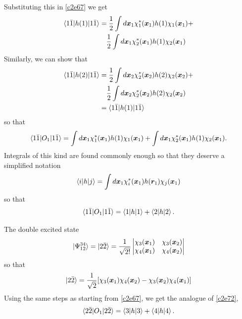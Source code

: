 Substituting this in \eqref{c2e67} we get
\begin{equation}\label{c2e68}
\begin{aligned}
\braket{1\bar{1}|h(1)|1\bar{1}} &= 
\frac{1}{2}\int d\bm{x}_1\chi_1^\ast(\bm{x}_1)h(1)\chi_1(\bm{x}_1) + \\
 &\quad\frac{1}{2}\int d\bm{x}_1 \chi_2^\ast(\bm{x}_1)h(1)\chi_2(\bm{x}_1)
\end{aligned}
\end{equation}
Similarly, we can show that
\begin{equation}\label{c2e69}
\begin{aligned}
\braket{1\bar{1}|h(2)|1\bar{1}} &= 
\frac{1}{2}\int d\bm{x}_2\chi_2^\ast(\bm{x}_2)h(2)\chi_2(\bm{x}_2) + \\
 &\quad\frac{1}{2}\int d\bm{x}_2 \chi_2^\ast(\bm{x}_2)h(2)\chi_2(\bm{x}_2) \\
 &= \braket{1\bar{1}|h(1)|1\bar{1}}
\end{aligned}
\end{equation}
so that
\begin{equation}\label{c2e70}
\braket{1\bar{1}|O_1|1\bar{1}} = 
\int d\bm{x}_1\chi_1^\ast(\bm{x}_1)h(1)\chi_1(\bm{x}_1) +
\int d\bm{x}_1 \chi_2^\ast(\bm{x}_1)h(1)\chi_2(\bm{x}_1).
\end{equation}
Integrals of this kind are found commonly enough so that they deserve a 
simplified notation
\begin{equation}\label{c2e71}
\braket{i|h|j} = 
\int d\bm{x}_1\chi_i^\ast(\bm{x}_1)h(\bm{r}_1)\chi_j(\bm{x}_1)
\end{equation}
so that
\begin{equation}\label{c2e72}
\braket{1\bar{1}|O_1|1\bar{1}} = \braket{1|h|1} + \braket{2|h|2}.
\end{equation}

The double excited state
\[
\ket{\Psi_{12}^{34}} = \ket{2\bar{2}} = \frac{1}{\sqrt{2!}}\begin{vmatrix}
\chi_3(\bm{x}_1) & \chi_3(\bm{x}_2) \\
\chi_4(\bm{x}_1) & \chi_4(\bm{x}_2)
\end{vmatrix}
\]
so that
\[
\ket{2\bar{2}} = \frac{1}{\sqrt{2}}[\chi_3(\bm{x}_1)\chi_4(\bm{x}_2) -
\chi_3(\bm{x}_2)\chi_4(\bm{x}_1)]
\]
Using the same steps as starting from \eqref{c2e67}, we get the analogue of
\eqref{c2e72},
\begin{equation}\label{c2e73}
\braket{2\bar{2}|O_1|2\bar{2}} = \braket{3|h|3} + \braket{4|h|4}.
\end{equation}

